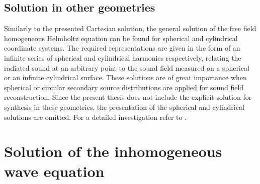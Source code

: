 %
\subsection{Solution in other geometries}
Similarly to the presented Cartesian solution, the general solution of the free field homogeneous Helmholtz equation can be found for spherical and cylindrical coordinate systems. 
The required representations are given in the form of an infinite series of spherical and cylindrical harmonics respectively, relating the radiated sound at an arbitrary point to the sound field measured on a spherical or an infinite cylindrical surface.
These solutions are of great importance when spherical or circular secondary source distributions are applied for sound field reconstruction. 
Since the present thesis does not include the explicit solution for synthesis in these geometries, the presentation of the spherical and cylindrical solutions are omitted. 
For a detailed investigation refer to \cite{Williams1999, Zotter2009phd, Fazi2010, Ahrens2012, Koyama2014:phd}.
%
%
%
%
%
%
%
%
%
%
%
%
\section{Solution of the inhomogeneous wave equation}

